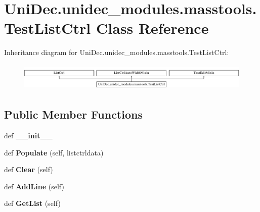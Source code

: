 \hypertarget{class_uni_dec_1_1unidec__modules_1_1masstools_1_1_test_list_ctrl}{}\section{Uni\+Dec.\+unidec\+\_\+modules.\+masstools.\+Test\+List\+Ctrl Class Reference}
\label{class_uni_dec_1_1unidec__modules_1_1masstools_1_1_test_list_ctrl}
Inheritance diagram for Uni\+Dec.\+unidec\+\_\+modules.\+masstools.\+Test\+List\+Ctrl\+:\begin{figure}[H]
\begin{center}
\leavevmode
\includegraphics[height=1.333333cm]{class_uni_dec_1_1unidec__modules_1_1masstools_1_1_test_list_ctrl}
\end{center}
\end{figure}
\subsection*{Public Member Functions}
\begin{DoxyCompactItemize}
\item 
\hypertarget{class_uni_dec_1_1unidec__modules_1_1masstools_1_1_test_list_ctrl_aa6e1a7a88034f7d2bb47f0b0de393897}{}def {\bfseries \+\_\+\+\_\+init\+\_\+\+\_\+}\label{class_uni_dec_1_1unidec__modules_1_1masstools_1_1_test_list_ctrl_aa6e1a7a88034f7d2bb47f0b0de393897}

\item 
\hypertarget{class_uni_dec_1_1unidec__modules_1_1masstools_1_1_test_list_ctrl_a5d56654fe974169bf870477292699e13}{}def {\bfseries Populate} (self, listctrldata)\label{class_uni_dec_1_1unidec__modules_1_1masstools_1_1_test_list_ctrl_a5d56654fe974169bf870477292699e13}

\item 
\hypertarget{class_uni_dec_1_1unidec__modules_1_1masstools_1_1_test_list_ctrl_a1e2498ab179ed1cf6cf8cbc0e358e54b}{}def {\bfseries Clear} (self)\label{class_uni_dec_1_1unidec__modules_1_1masstools_1_1_test_list_ctrl_a1e2498ab179ed1cf6cf8cbc0e358e54b}

\item 
\hypertarget{class_uni_dec_1_1unidec__modules_1_1masstools_1_1_test_list_ctrl_ad1a2d232cef9fbe452318ba662552bba}{}def {\bfseries Add\+Line} (self)\label{class_uni_dec_1_1unidec__modules_1_1masstools_1_1_test_list_ctrl_ad1a2d232cef9fbe452318ba662552bba}

\item 
\hypertarget{class_uni_dec_1_1unidec__modules_1_1masstools_1_1_test_list_ctrl_a4cfad24ab3bf7adcb860b00445d7b804}{}def {\bfseries Get\+List} (self)\label{class_uni_dec_1_1unidec__modules_1_1masstools_1_1_test_list_ctrl_a4cfad24ab3bf7adcb860b00445d7b804}

\end{DoxyCompactItemize}
